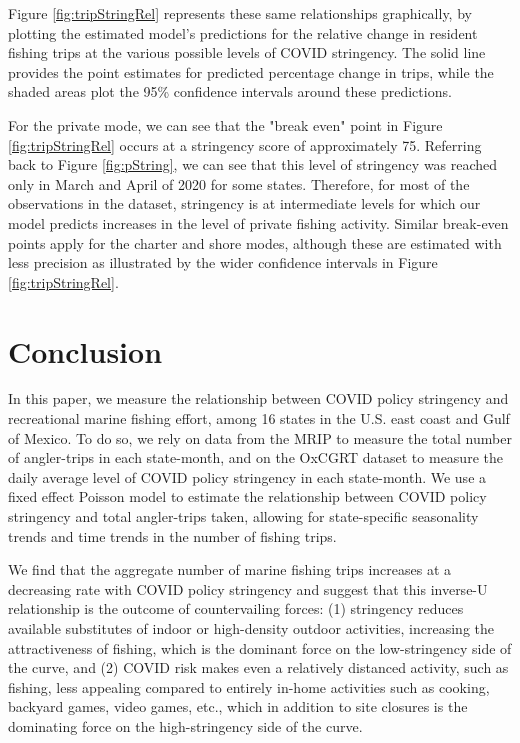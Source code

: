 \documentclass[12pt]{article}
\begin{document}
Figure \ref{fig:tripStringRel} represents these same relationships
graphically, by plotting the estimated model's predictions for the
relative change in resident fishing trips at the various possible levels
of COVID stringency. The solid line provides the point estimates for
predicted percentage change in trips, while the shaded areas plot the
95\% confidence intervals around these predictions.

For the private mode, we can see that the "break even" point in Figure \ref{fig:tripStringRel} occurs at a stringency score of approximately 75. Referring back to Figure \ref{fig:pString}, we can see that this level of stringency was reached only in March and April of 2020 for some states. Therefore, for most of the observations in the dataset, stringency is at intermediate levels for which our model predicts increases in the level of private fishing activity. Similar break-even points apply for the charter and shore modes, although these are estimated with less precision as illustrated by the wider confidence intervals in Figure \ref{fig:tripStringRel}.


\section{Conclusion}

In this paper, we measure the relationship between COVID policy stringency and
recreational marine fishing effort, among 16 states in the U.S. east coast and Gulf of Mexico.
To do so, we rely on data from the MRIP to measure the total number of
angler-trips in each state-month, and on the OxCGRT dataset to measure
the daily average level of COVID policy stringency in each state-month. We
use a fixed effect Poisson model to estimate the 
relationship between COVID policy stringency and total angler-trips taken, allowing for state-specific seasonality trends and time
trends in the number of fishing trips.

We find that the aggregate number of marine fishing trips increases at a decreasing rate with COVID policy stringency and suggest that this inverse-U relationship is the outcome of
countervailing forces: (1) stringency reduces available substitutes of
indoor or high-density outdoor activities, increasing the attractiveness
of fishing, which is the dominant force on the low-stringency side of
the curve, and (2) COVID risk makes even a relatively distanced
activity, such as fishing, less appealing compared to entirely in-home
activities such as cooking, backyard games, video games, etc., which in
addition to site closures is the dominating force on the high-stringency
side of the curve.
\end{document}
